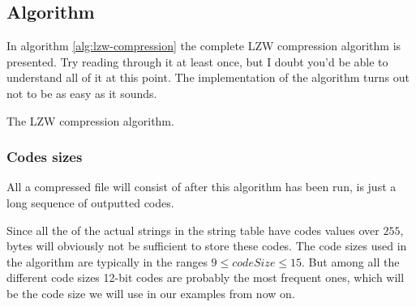 \begin{refsection}
\subsection{Algorithm}

In algorithm \ref{alg:lzw-compression} the complete LZW compression
algorithm is presented. Try reading through it at least once,
but I doubt you'd be able to understand all of it at this point. The
implementation of the algorithm turns out not to be as easy as it
sounds.

\begin{algorithm}[H]
  \caption{The LZW compression algorithm.}
  \label{alg:lzw-compression}
  \begin{algorithmic}[1]

    \While{\neof}

       \label{algl:hasingcheckintable}
         \label{algl:hasgetcode}
      \Else
        \State {}


          \State {}\label{algl:hashadd}

        \EndIf


      \EndIf


    \EndWhile

    \State {}
    \State {}

  \end{algorithmic}
\end{algorithm}

\subsubsection{Codes sizes}

All a \lzw compressed file will consist of after this algorithm has
been run, is just a long sequence of outputted codes.

Since all the of the actual strings in the string table have codes
values over $255$, bytes will obviously not be sufficient to store
these codes. The code sizes used in the \lzw
algorithm are typically in the ranges $9 \leq codeSize \leq 15$. But
among all the different code sizes 12-bit codes are probably the most
frequent ones, which will be the code size we will use in our examples from
now on.


\end{refsection}
